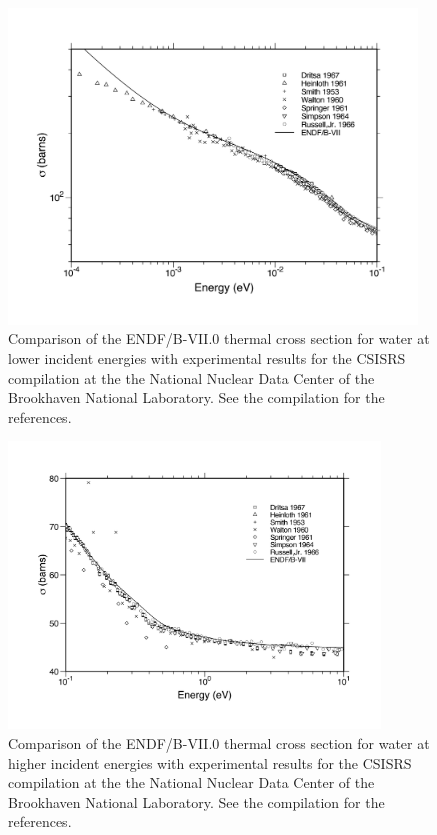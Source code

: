 \begin{figure}[b]\centering
\includegraphics[keepaspectratio, height=3.3in, angle=0]{figs/hh2o-tot1ack}
\caption[Comparison of the ENDF/B-VII.0 thermal cross section for water at
 lower incident energies with experimental results]{Comparison of the
 ENDF/B-VII.0 thermal cross section for water at lower incident energies
 with experimental results for the CSISRS compilation at the the National
 Nuclear Data Center of the Brookhaven National Laboratory.  See the
 compilation for the references.}
\label{hh2o-tot1}
\end{figure}

\begin{figure}[t]\centering
\includegraphics[keepaspectratio, height=3.0in, angle=0]{figs/hh2o-tot2ack}
\caption[Comparison of the ENDF/B-VII.0 thermal cross section for water at
 higher incident energies with experimental results]{Comparison of the
 ENDF/B-VII.0 thermal cross section for water at higher incident energies
 with experimental results for the CSISRS compilation at the the National
 Nuclear Data Center of the Brookhaven National Laboratory.  See the
 compilation for the references.}
\label{hh2o-tot2}
\end{figure}

